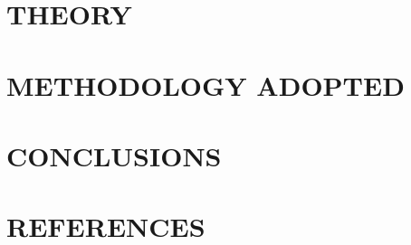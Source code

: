 \documentclass[14pt]{extarticle}
\begin{document}
\newpage
\section{THEORY}


\newpage
\section{METHODOLOGY ADOPTED}

\newpage
\section{CONCLUSIONS}

\newpage
{}
\section*{REFERENCES}
\end{document}
